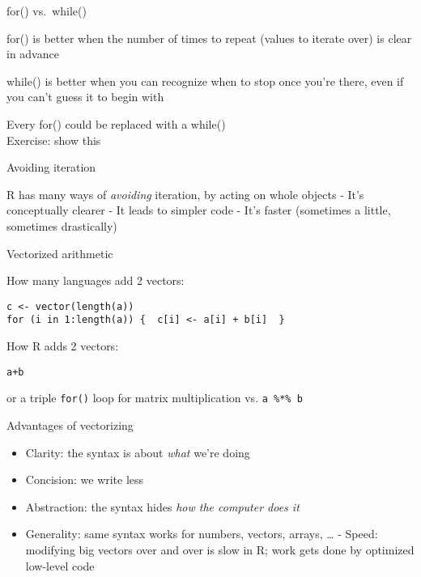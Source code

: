 \documentclass[8pt,ignorenonframetext,]{beamer}
\providecommand{\tightlist}{%
  \setlength{\itemsep}{0pt}\setlength{\parskip}{0pt}}
\begin{document}
\begin{frame}{for() vs.~while()}

for() is better when the number of times to repeat (values to iterate
over) is clear in advance

while() is better when you can recognize when to stop once you're there,
even if you can't guess it to begin with

Every for() could be replaced with a while()\\
Exercise: show this

\end{frame}

\begin{frame}{Avoiding iteration}

R has many ways of \emph{avoiding} iteration, by acting on whole objects
- It's conceptually clearer - It leads to simpler code - It's faster
(sometimes a little, sometimes drastically)

\end{frame}

\begin{frame}[fragile]{Vectorized arithmetic}

How many languages add 2 vectors:

\begin{verbatim}
c <- vector(length(a))
for (i in 1:length(a)) {  c[i] <- a[i] + b[i]  }
\end{verbatim}

How R adds 2 vectors:

\begin{verbatim}
a+b
\end{verbatim}

or a triple \texttt{for()} loop for matrix multiplication vs.
\texttt{a\ \%*\%\ b}

\end{frame}

\begin{frame}{Advantages of vectorizing}

\begin{itemize}
\tightlist
\item
  Clarity: the syntax is about \emph{what} we're doing
\item
  Concision: we write less
\item
  Abstraction: the syntax hides \emph{how the computer does it}
\item
  Generality: same syntax works for numbers, vectors, arrays, \ldots{} -
  Speed: modifying big vectors over and over is slow in R; work gets
  done by optimized low-level code
\end{itemize}

\end{frame}
\end{document}
